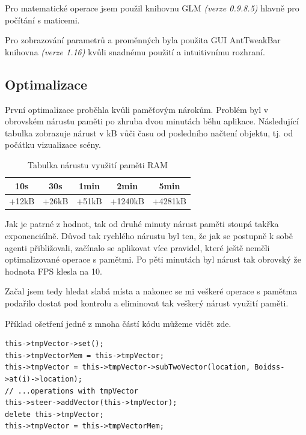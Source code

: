 \documentclass[czech,public,dept460,male,cpdeclaration]{diploma}
\begin{document}
Pro matematické operace jsem použil knihovnu GLM \cite{linkToGLM} \textit{(verze 0.9.8.5)} hlavně pro počítání s maticemi.

Pro zobrazování parametrů a proměnných byla použita GUI AntTweakBar knihovna \textit{(verze 1.16)} \cite{linkToAntTweakBar} kvůli snadnému použití a intuitivnímu rozhraní.

\subsection{Optimalizace}

První optimalizace proběhla kvůli paměťovým nárokům. Problém byl v obrovském nárustu paměti po zhruba dvou minutách běhu aplikace. Následující tabulka zobrazuje nárust v kB vůči času od posledního načtení objektu, tj. od počátku vizualizace scény.

\begin{table}[H]
	\centering
	\caption{Tabulka nárustu využití paměti RAM}
	\label{tab:ramoptimalization}
	\renewcommand{\arraystretch}{1.5}
	\begin{tabular}{| c | c | c | c | c |}
		\hline
		10s & 30s & 1min & 2min & 5min\\\hline
		+12kB & +26kB & +51kB & +1240kB & +4281kB\\
		\hline
	\end{tabular}
\end{table}

Jak je patrné z hodnot, tak od druhé minuty nárust paměti stoupá takřka exponenciálně. Důvod tak rychlého nárustu byl ten, že jak se postupně k sobě agenti přibližovali, začínalo se aplikovat více pravidel, které ještě neměli optimalizované operace s pamětmi. Po pěti minutách byl nárust tak obrovský že hodnota FPS klesla na 10. 

Začal jsem tedy hledat slabá místa a nakonec se mi veškeré operace s pamětma podařilo dostat pod kontrolu a eliminovat tak veškerý nárust využití paměti. 

Příklad ošetření jedné z mnoha částí kódu můžeme vidět zde.

\begin{lstlisting}[label=src:memory elimination,caption=Ukázka eliminace nárustu paměti]
this->tmpVector->set();
this->tmpVectorMem = this->tmpVector;
this->tmpVector = this->tmpVector->subTwoVector(location, Boidss->at(i)->location);
// ...operations with tmpVector
this->steer->addVector(this->tmpVector);
delete this->tmpVector;
this->tmpVector = this->tmpVectorMem;
\end{lstlisting}
\end{document}
